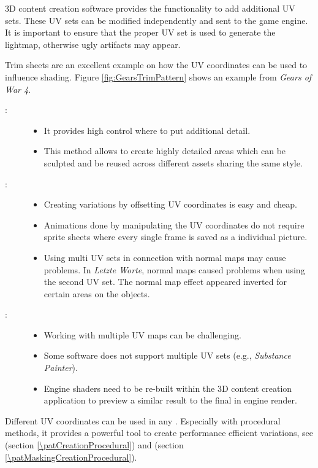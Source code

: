 \begin{description}
\begin{itemize}
	\end{itemize}
	\item[\patImplementation:]%
	3D content creation software provides the functionality to add additional UV sets. These UV sets can be modified independently and sent to the game engine. It is important to ensure that the proper UV set is used to generate the lightmap, otherwise ugly artifacts may appear.   
	\item[\patExamples:]%
	Trim sheets are an excellent example on how the UV coordinates can be used to influence shading. Figure \ref{fig:GearsTrimPattern} shows an example from \emph{Gears of War 4}.
	\item[\patConsequences:]\hfill 
		\begin{description}
			\item[\visual:]\hfill
			\begin{itemize}\mynobreakpar
				\item It provides high control where to put additional detail. 
				\item This method allows to create highly detailed areas which can be sculpted and be reused across different assets sharing the same style. 
			\end{itemize}
			\item[\performance:]\hfill
			\begin{itemize}\mynobreakpar
				\item Creating variations by offsetting UV coordinates is easy and cheap.
				\item Animations done by manipulating the UV coordinates do not require sprite sheets where every single frame is saved as a individual picture. 
				\item Using multi UV sets in connection with normal maps may cause problems. In \emph{Letzte Worte}, normal maps caused problems when using the second UV set. The normal map effect appeared inverted for certain areas on the objects. 
			\end{itemize}
			\item[\pipeline:]\hfill
			\begin{itemize}\mynobreakpar
				\item Working with multiple UV maps can be challenging.
				\item Some software does not support multiple UV sets (e.g., \emph{Substance Painter}).
				\item Engine shaders need to be re-built within the 3D content creation application to preview a similar result to the final in engine render.   
			\end{itemize}
		\end{description}
	\item[\patRelations:]%
	Different UV coordinates can be used in any \emph{\patImplementationCustomShader}. Especially with procedural methods, it provides a powerful tool to create performance efficient variations, see \emph{\patCreationProcedural} (section \ref{\patCreationProcedural}) and \emph{\patMaskingCreationProcedural}	 (section \ref{\patMaskingCreationProcedural}).
\end{description}



